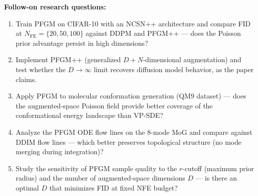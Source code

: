 \documentclass[11pt]{article}
\begin{document}
\noindent\textbf{Follow-on research questions:}
\begin{enumerate}[leftmargin=1.6em,itemsep=0.2em,topsep=0.2em,label=Q\arabic*.]
\item Train PFGM on CIFAR-10 with an NCSN++ architecture and compare FID at $N_\mathrm{FE}=\{20, 50, 100\}$ against DDPM and PFGM++ --- does the Poisson prior advantage persist in high dimensions?
\item Implement PFGM++ (generalized $D+N$-dimensional augmentation) and test whether the $D\to\infty$ limit recovers diffusion model behavior, as the paper claims.
\item Apply PFGM to molecular conformation generation (QM9 dataset) --- does the augmented-space Poisson field provide better coverage of the conformational energy landscape than VP-SDE?
\item Analyze the PFGM ODE flow lines on the 8-mode MoG and compare against DDIM flow lines --- which better preserves topological structure (no mode merging during integration)?
\item Study the sensitivity of PFGM sample quality to the $r$-cutoff (maximum prior radius) and the number of augmented-space dimensions $D$ --- is there an optimal $D$ that minimizes FID at fixed NFE budget?
\end{enumerate}
\end{document}
